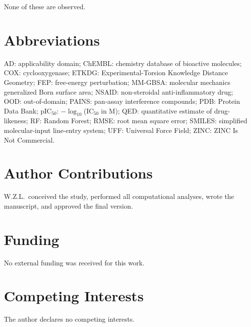 \documentclass[11pt]{article}
\begin{document}
None of these are observed.

\section*{Abbreviations}

\noindent
AD: applicability domain; ChEMBL: chemistry database of bioactive molecules; COX: cyclooxygenase; ETKDG: Experimental-Torsion Knowledge Distance Geometry; FEP: free-energy perturbation; MM-GBSA: molecular mechanics generalized Born surface area; NSAID: non-steroidal anti-inflammatory drug; OOD: out-of-domain; PAINS: pan-assay interference compounds; PDB: Protein Data Bank; pIC$_{50}$: $-\log_{10}$(IC$_{50}$ in M); QED: quantitative estimate of drug-likeness; RF: Random Forest; RMSE: root mean square error; SMILES: simplified molecular-input line-entry system; UFF: Universal Force Field; ZINC: ZINC Is Not Commercial.

\section*{Author Contributions}

W.Z.L.\ conceived the study, performed all computational analyses, wrote the manuscript, and approved the final version.

\section*{Funding}

No external funding was received for this work.

\section*{Competing Interests}

The author declares no competing interests.
\end{document}
